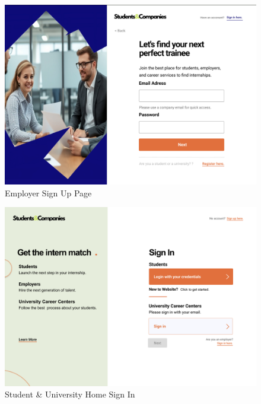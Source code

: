 \documentclass{article}
\begin{document}
\begin{figure}[H]
    \centering
    \includegraphics[scale = 0.45]{figures/UserInterfaces/General/EmployerSignUp.png}
    \caption{Employer Sign Up Page}
    \centering
\end{figure}
\begin{figure}[H]
    \centering
    \includegraphics[scale = 0.42]{figures/UserInterfaces/General/HomeSignIn.png}
    \caption{Student \& University Home Sign In}
     \centering
\end{figure}
\end{document}
